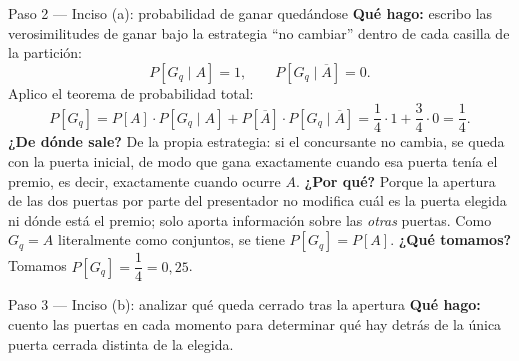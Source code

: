 \documentclass[11pt]{article}
\begin{document}
\begin{sol}
\begin{paso}{Paso 2 --- Inciso (a): probabilidad de ganar quedándose}
\textbf{Qu\'e hago:} escribo las verosimilitudes de ganar bajo la estrategia ``no cambiar'' dentro de cada casilla de la partici\'on:
\[
P[G_{q}\mid A]=1,\qquad P[G_{q}\mid \overline{A}]=0 .
\]
Aplico el teorema de probabilidad total:
\[
P[G_{q}]=P[A]\cdot P[G_{q}\mid A]+P[\overline{A}]\cdot P[G_{q}\mid \overline{A}]
=\frac14\cdot 1+\frac34\cdot 0=\frac14 .
\]
\textbf{¿De d\'onde sale?} De la propia estrategia: si el concursante no cambia, se queda con la puerta inicial, de modo que gana exactamente cuando esa puerta ten\'ia el premio, es decir, exactamente cuando ocurre $A$.
\textbf{¿Por qu\'e?} Porque la apertura de las dos puertas por parte del presentador no modifica cu\'al es la puerta elegida ni d\'onde est\'a el premio; solo aporta informaci\'on sobre las \emph{otras} puertas. Como $G_{q}=A$ literalmente como conjuntos, se tiene $P[G_{q}]=P[A]$.
\textbf{¿Qu\'e tomamos?} Tomamos $P[G_{q}]=\dfrac{1}{4}=0{,}25$.
\end{paso}

\begin{paso}{Paso 3 --- Inciso (b): analizar qu\'e queda cerrado tras la apertura}
\textbf{Qu\'e hago:} cuento las puertas en cada momento para determinar qu\'e hay detr\'as de la \'unica puerta cerrada distinta de la elegida.


\end{paso}
\end{sol}
\end{document}
